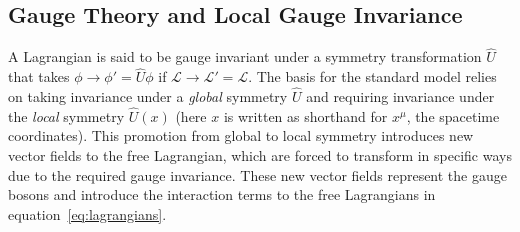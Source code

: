 \subsection{Gauge Theory and Local Gauge Invariance} \label{sec:sm_theory_gauge}
A Lagrangian is said to be gauge invariant under a symmetry transformation $\hat{U}$ that takes $\phi\to\phi'=\hat{U}\phi$ if $\mathcal{L}\to\mathcal{L}'=\mathcal{L}$. The basis for the standard model relies on taking invariance under a \textit{global} symmetry $\hat{U}$ and requiring invariance under the \textit{local} symmetry $\hat{U}(x)$ (here $x$ is written as shorthand for $x^\mu$, the spacetime coordinates). This promotion from global to local symmetry introduces new vector fields to the free Lagrangian, which are forced to transform in specific ways due to the required gauge invariance. These new vector fields represent the gauge bosons and introduce the interaction terms to the free Lagrangians in equation~\ref{eq:lagrangians}.

